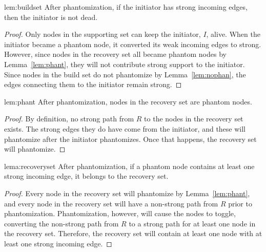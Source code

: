\begin{replemma}{lem:buildset}
After phantomization, if the initiator has strong incoming edges, then the
initiator is not dead.
\end{replemma}
\begin{proof}
Only nodes in the supporting set can keep the initiator, $I$, alive. %
When the initiator became a phantom node, it converted its weak incoming edges to strong.
However, since nodes in the recovery set all became phantom nodes by Lemma~\ref{lem:phant},
they will not contribute strong support to the initiator.
Since nodes in the build set do not phantomize by Lemma~\ref{lem:nophan}, the edges connecting them to the initiator
remain strong.
\end{proof}

\begin{replemma}{lem:phant}
After phantomization, nodes in the recovery set are phantom nodes.
\end{replemma}
\begin{proof}
By definition, no strong path from $R$ to the nodes in the recovery set
exists. The strong edges they do have come from the initiator, and these will
phantomize after the initiator phantomizes. Once that happens, the recovery
set will phantomize.
\end{proof}

\begin{replemma}{lema:recoveryset}
After phantomization,
if a phantom node contains at least one strong incoming edge,
it belongs to the recovery set.
\end{replemma}
\begin{proof}

Every node in the recovery set will phantomize by Lemma~\ref{lem:phant}, and every node
in the recovery set will have a non-strong path from $R$ prior to
phantomization. Phantomization, however, will cause the nodes to toggle,
converting the non-strong path from $R$ to a strong path for at least one
node in the recovery set. Therefore, the
recovery set will contain at least one node with at least one strong incoming edge.

\end{proof}

